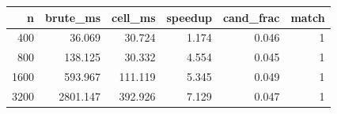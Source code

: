 \begin{tabular}{rrrrrr}
\toprule
n & brute_ms & cell_ms & speedup & cand_frac & match \\
\midrule
400 & 36.069 & 30.724 & 1.174 & 0.046 & 1 \\
800 & 138.125 & 30.332 & 4.554 & 0.045 & 1 \\
1600 & 593.967 & 111.119 & 5.345 & 0.049 & 1 \\
3200 & 2801.147 & 392.926 & 7.129 & 0.047 & 1 \\
\bottomrule
\end{tabular}
